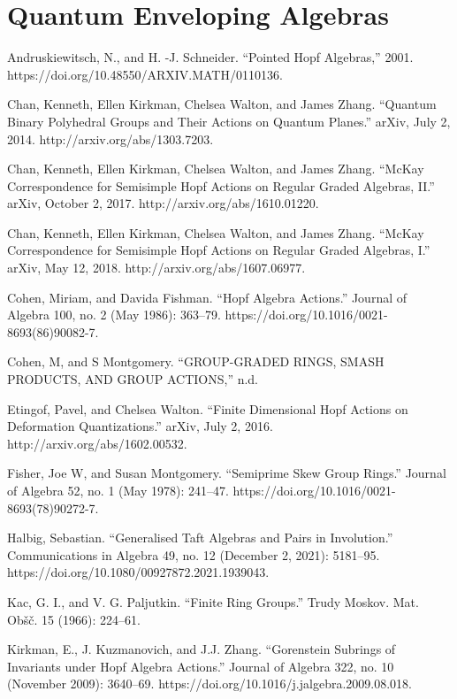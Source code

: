\documentclass[12pt,a4paper]{article}
\newcommand\1{_{(1)}}
\newcommand\2{_{(2)}}
\begin{document}
\section{Quantum Enveloping Algebras}



\begin{thebibliography}{99}
Andruskiewitsch, N., and H. -J. Schneider. “Pointed Hopf Algebras,” 2001. https://doi.org/10.48550/ARXIV.MATH/0110136.

Chan, Kenneth, Ellen Kirkman, Chelsea Walton, and James Zhang. “Quantum Binary Polyhedral Groups and Their Actions on Quantum Planes.” arXiv, July 2, 2014. http://arxiv.org/abs/1303.7203.

Chan, Kenneth, Ellen Kirkman, Chelsea Walton, and James Zhang. “McKay Correspondence for Semisimple Hopf Actions on Regular Graded Algebras, II.” arXiv, October 2, 2017. http://arxiv.org/abs/1610.01220.

Chan, Kenneth, Ellen Kirkman, Chelsea Walton, and James Zhang. “McKay Correspondence for Semisimple Hopf Actions on Regular Graded Algebras, I.” arXiv, May 12, 2018. http://arxiv.org/abs/1607.06977.

Cohen, Miriam, and Davida Fishman. “Hopf Algebra Actions.” Journal of Algebra 100, no. 2 (May 1986): 363–79. https://doi.org/10.1016/0021-8693(86)90082-7.

Cohen, M, and S Montgomery. “GROUP-GRADED RINGS, SMASH PRODUCTS, AND GROUP ACTIONS,” n.d.

Etingof, Pavel, and Chelsea Walton. “Finite Dimensional Hopf Actions on Deformation Quantizations.” arXiv, July 2, 2016. http://arxiv.org/abs/1602.00532.

Fisher, Joe W, and Susan Montgomery. “Semiprime Skew Group Rings.” Journal of Algebra 52, no. 1 (May 1978): 241–47. https://doi.org/10.1016/0021-8693(78)90272-7.

Halbig, Sebastian. “Generalised Taft Algebras and Pairs in Involution.” Communications in Algebra 49, no. 12 (December 2, 2021): 5181–95. https://doi.org/10.1080/00927872.2021.1939043.

Kac, G. I., and V. G. Paljutkin. “Finite Ring Groups.” Trudy Moskov. Mat. Ob\v s\v c. 15 (1966): 224–61.

Kirkman, E., J. Kuzmanovich, and J.J. Zhang. “Gorenstein Subrings of Invariants under Hopf Algebra Actions.” Journal of Algebra 322, no. 10 (November 2009): 3640–69. https://doi.org/10.1016/j.jalgebra.2009.08.018.


\end{thebibliography}
\end{document}

